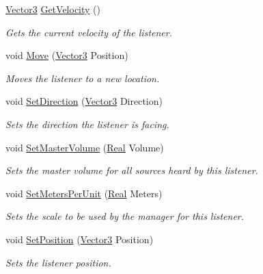 \begin{DoxyCompactItemize}
\hyperlink{classMezzanine_1_1Vector3}{Vector3} \hyperlink{classMezzanine_1_1Audio_1_1Listener_a37849fe42431d7a65b57ffffd465bdf0}{GetVelocity} ()
\begin{DoxyCompactList}\small\item\em Gets the current velocity of the listener. \item\end{DoxyCompactList}\item 
void \hyperlink{classMezzanine_1_1Audio_1_1Listener_a9b87e62d1375016ebf4d93b6acc850e0}{Move} (\hyperlink{classMezzanine_1_1Vector3}{Vector3} Position)
\begin{DoxyCompactList}\small\item\em Moves the listener to a new location. \item\end{DoxyCompactList}\item 
void \hyperlink{classMezzanine_1_1Audio_1_1Listener_aad69b1999d6b81e84b7ac6aa8905a574}{SetDirection} (\hyperlink{classMezzanine_1_1Vector3}{Vector3} Direction)
\begin{DoxyCompactList}\small\item\em Sets the direction the listener is facing. \item\end{DoxyCompactList}\item 
void \hyperlink{classMezzanine_1_1Audio_1_1Listener_a7c99b492e90de19622734d2e7552841c}{SetMasterVolume} (\hyperlink{namespaceMezzanine_a726731b1a7df72bf3583e4a97282c6f6}{Real} Volume)
\begin{DoxyCompactList}\small\item\em Sets the master volume for all sources heard by this listener. \item\end{DoxyCompactList}\item 
void \hyperlink{classMezzanine_1_1Audio_1_1Listener_ab413b3d85270ff5ff816b4cc5c23554e}{SetMetersPerUnit} (\hyperlink{namespaceMezzanine_a726731b1a7df72bf3583e4a97282c6f6}{Real} Meters)
\begin{DoxyCompactList}\small\item\em Sets the scale to be used by the manager for this listener. \item\end{DoxyCompactList}\item 
void \hyperlink{classMezzanine_1_1Audio_1_1Listener_a88176e6cc43ba46337f445a58d1985a9}{SetPosition} (\hyperlink{classMezzanine_1_1Vector3}{Vector3} Position)
\begin{DoxyCompactList}\small\item\em Sets the listener position. \item\end{DoxyCompactList}\item 

\end{DoxyCompactItemize}
